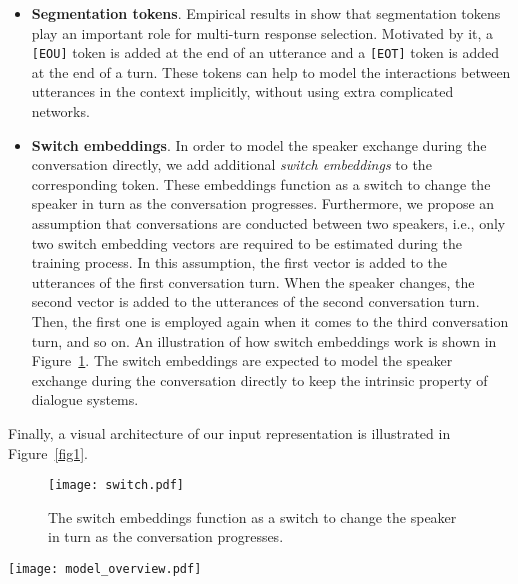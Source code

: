 \documentclass[letterpaper]{article} \usepackage{aaai20}  \usepackage{times}  \usepackage{helvet} \usepackage{courier}  \usepackage[hyphens]{url}  \usepackage{graphicx} \urlstyle{rm} \def\UrlFont{\rm}  \usepackage{graphicx}  \frenchspacing  \setlength{\pdfpagewidth}{8.5in}  \setlength{\pdfpageheight}{11in}
\begin{document}
    \begin{itemize}
      \item \textbf{Segmentation tokens}.
            Empirical results in \cite{DBLP:journals/corr/abs-1802-02614} show that segmentation tokens play an important role for multi-turn response selection.
            Motivated by it, a \texttt{[EOU]} token is added at the end of an utterance and a \texttt{[EOT]} token is added at the end of a turn.
            These tokens can help to model the interactions between utterances in the context implicitly, without using extra complicated networks.
      \item \textbf{Switch embeddings}.
            In order to model the speaker exchange during the conversation directly, we add additional \emph{switch embeddings} to the corresponding token.
            These embeddings function as a switch to change the speaker in turn as the conversation progresses.
            Furthermore, we propose an assumption that conversations are conducted between two speakers, i.e., only two switch embedding vectors are required to be estimated during the training process.
            In this assumption, the first vector is added to the utterances of the first conversation turn.
            When the speaker changes, the second vector is added to the utterances of the second conversation turn.
            Then, the first one is employed again when it comes to the third conversation turn, and so on.
            An illustration of how switch embeddings work is shown in Figure~\ref{fig2}.
            The switch embeddings are expected to model the speaker exchange during the conversation directly to keep the intrinsic property of dialogue systems.
    \end{itemize}

    Finally, a visual architecture of our input representation is illustrated in Figure~\ref{fig1}.

    \begin{figure}
      \centering
      \texttt{[image: switch.pdf]}
      \caption{The switch embeddings function as a switch to change the speaker in turn as the conversation progresses.}
      \label{fig2}
    \end{figure}

    \begin{figure*}
      \centering
      \texttt{[image: model\_overview.pdf]}
      \caption{Input representation. The input embeddings is the sum of the token embeddings, the segmentation embeddings, the position embeddings and the switch embeddings.}
      \label{fig1}
    \end{figure*}
\end{document}
